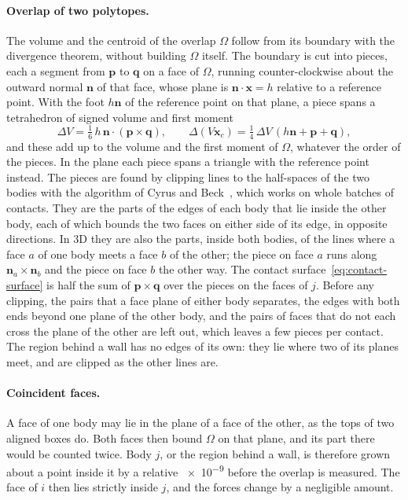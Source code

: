 \paragraph{Overlap of two polytopes.}
The volume and the centroid of the overlap $\Omega$ follow from its boundary with the divergence theorem, without building $\Omega$ itself.
The boundary is cut into pieces, each a segment from $\mathbf{p}$ to $\mathbf{q}$ on a face of $\Omega$, running counter-clockwise about the outward normal $\mathbf{n}$ of that face, whose plane is $\mathbf{n}\cdot\mathbf{x}=h$ relative to a reference point.
With the foot $h\mathbf{n}$ of the reference point on that plane, a piece spans a tetrahedron of signed volume and first moment
\begin{equation}
  \Delta V = \tfrac{1}{6}\,h\,\mathbf{n}\cdot(\mathbf{p}\times\mathbf{q}),
  \qquad
  \Delta(V\mathbf{x}_{c}) = \tfrac{1}{4}\,\Delta V\,(h\mathbf{n}+\mathbf{p}+\mathbf{q}),
  \label{eq:tetrahedron}
\end{equation}
and these add up to the volume and the first moment of $\Omega$, whatever the order of the pieces.
In the plane each piece spans a triangle with the reference point instead.
The pieces are found by clipping lines to the half-spaces of the two bodies with the algorithm of Cyrus and Beck~\cite{cyrus1978}, which works on whole batches of contacts.
They are the parts of the edges of each body that lie inside the other body, each of which bounds the two faces on either side of its edge, in opposite directions.
In 3D they are also the parts, inside both bodies, of the lines where a face $a$ of one body meets a face $b$ of the other; the piece on face $a$ runs along $\mathbf{n}_{a}\times\mathbf{n}_{b}$ and the piece on face $b$ the other way.
The contact surface~\eqref{eq:contact-surface} is half the sum of $\mathbf{p}\times\mathbf{q}$ over the pieces on the faces of $j$.
Before any clipping, the pairs that a face plane of either body separates, the edges with both ends beyond one plane of the other body, and the pairs of faces that do not each cross the plane of the other are left out, which leaves a few pieces per contact.
The region behind a wall has no edges of its own: they lie where two of its planes meet, and are clipped as the other lines are.

\paragraph{Coincident faces.}
A face of one body may lie in the plane of a face of the other, as the tops of two aligned boxes do.
Both faces then bound $\Omega$ on that plane, and its part there would be counted twice.
Body $j$, or the region behind a wall, is therefore grown about a point inside it by a relative \num{e-9} before the overlap is measured.
The face of $i$ then lies strictly inside $j$, and the forces change by a negligible amount.

